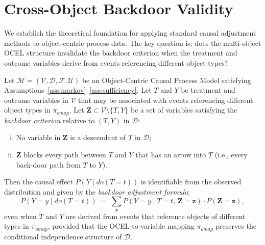 \section{Cross-Object Backdoor Validity}
\label{sec:theorem}

We establish the theoretical foundation for applying standard causal
adjustment methods to object-centric process data. The key question is:
does the multi-object OCEL structure invalidate the backdoor criterion
when the treatment and outcome variables derive from events referencing
different object types?

\begin{theorem}
\label{thm:backdoor}
Let $\mathcal{M} = (\mathcal{V}, \mathcal{D}, \mathcal{F}, \mathcal{U})$
be an Object-Centric Causal Process Model satisfying
Assumptions~\ref{ass:markov}--\ref{ass:sufficiency}. Let $T$ and $Y$ be
treatment and outcome variables in $\mathcal{V}$ that may be associated with
events referencing different object types in $\pi_{\mathit{omap}}$. Let
$\mathbf{Z} \subset \mathcal{V} \setminus \{T, Y\}$ be a set of variables
satisfying the \emph{backdoor criterion} relative to $(T, Y)$ in $\mathcal{D}$:
\begin{enumerate}[(i)]
    \item No variable in $\mathbf{Z}$ is a descendant of $T$ in $\mathcal{D}$;
    \item $\mathbf{Z}$ blocks every path between $T$ and $Y$ that has an
          arrow into $T$ (i.e., every back-door path from $T$ to $Y$).
\end{enumerate}

Then the causal effect $P(Y \mid do(T=t))$ is identifiable from the observed
distribution and given by the \emph{backdoor adjustment formula}:
\begin{equation}
\label{eq:backdoor}
P(Y = y \mid do(T=t)) \;=\; \sum_{\mathbf{z}}
P(Y = y \mid T = t,\, \mathbf{Z} = \mathbf{z}) \cdot P(\mathbf{Z} = \mathbf{z}),
\end{equation}
even when $T$ and $Y$ are derived from events that reference objects of
different types in $\pi_{\mathit{omap}}$, provided that the OCEL-to-variable
mapping $\pi_{\mathit{omap}}$ preserves the conditional independence structure
of $\mathcal{D}$.
\end{theorem}

